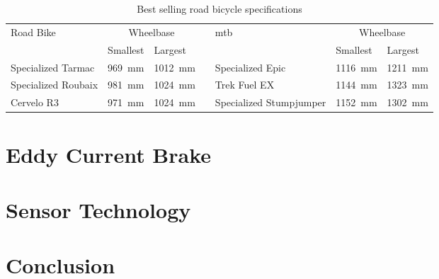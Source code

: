 \begin{table}[H]
	\renewcommand{\arraystretch}{1.2}
	\centering
	\caption{Best selling road bicycle specifications \citep{Geometry:2022}}
	\begin{tabularx}{\textwidth}{p{2.6cm} X Xp{0.05cm} p{2.6cm} X X}
		\toprule
		Road Bike           & \multicolumn{2}{c}{Wheelbase} &                         & \ac{mtb} & \multicolumn{2}{c}{Wheelbase}                                                     \\
		                    & Smallest                      & Largest                 &          &                               & Smallest                & Largest                 \\
		\midrule
		Specialized Tarmac  & \SI{969}{\milli\meter}        & \SI{1012}{\milli\meter} &          & Specialized Epic              & \SI{1116}{\milli\meter} & \SI{1211}{\milli\meter} \\
		Specialized Roubaix & \SI{981}{\milli\meter}        & \SI{1024}{\milli\meter} &          & Trek Fuel EX                  & \SI{1144}{\milli\meter} & \SI{1323}{\milli\meter} \\
		Cervelo R3          & \SI{971}{\milli\meter}        & \SI{1024}{\milli\meter} &          & Specialized Stumpjumper       & \SI{1152}{\milli\meter} & \SI{1302}{\milli\meter} \\
		\bottomrule
	\end{tabularx}
	\label{tab:bikes}
\end{table}

\section{Eddy Current Brake}
\section{Sensor Technology}
\section{Conclusion}
